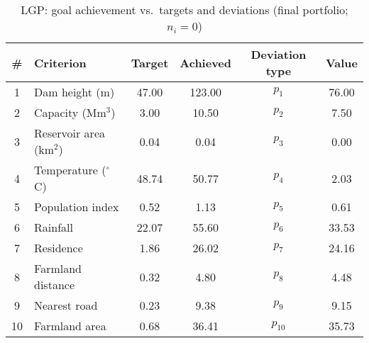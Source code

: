 \begin{table}[htbp]
\centering
\caption{LGP: goal achievement vs.\ targets and deviations (final portfolio; $n_i=0$)}
\label{tab:lgpAchievementVsTarget}
\begin{tabular}{clcccc}
\hline
\textbf{\#} & \textbf{Criterion} & \textbf{Target} & \textbf{Achieved} & \textbf{Deviation type} & \textbf{Value} \\
\hline
1  & Dam height (m)              & 47.00  & 123.00 & $p_{1}$  & 76.00 \\
2  & Capacity (Mm$^{3}$)         & 3.00   & 10.50  & $p_{2}$  & 7.50  \\
3  & Reservoir area (km$^{2}$)   & 0.04   & 0.04   & $p_{3}$  & 0.00  \\
4  & Temperature ($^{\circ}$C)    & 48.74  & 50.77  & $p_{4}$  & 2.03  \\
5  & Population index            & 0.52   & 1.13   & $p_{5}$  & 0.61  \\
6  & Rainfall                    & 22.07  & 55.60  & $p_{6}$  & 33.53 \\
7  & Residence                   & 1.86   & 26.02  & $p_{7}$  & 24.16 \\
8  & Farmland distance           & 0.32   & 4.80   & $p_{8}$  & 4.48  \\
9  & Nearest road                & 0.23   & 9.38   & $p_{9}$  & 9.15  \\
10 & Farmland area               & 0.68   & 36.41  & $p_{10}$ & 35.73 \\
\hline
\end{tabular}
\end{table}
